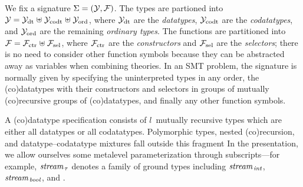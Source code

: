 We fix a signature $\mathrm{\Sigma} = (\mathcal{Y}, \mathcal{F})$. The types are partioned into
$\mathcal{Y} = \mathcal{Y}_{\mathrm{dt}} \mathrel{\uplus} \mathcal{Y}_{\mathrm{codt}} \mathrel{\uplus} \mathcal{Y}_{\mathrm{ord}}$, where $\mathcal{Y}_{\mathrm{dt}}$ are the
\emph{datatypes}, $\mathcal{Y}_{\mathrm{codt}}$ are the \emph{codatatypes}, and $\mathcal{Y}_{\mathrm{ord}}$ are the remaining
\emph{ordinary types}. The functions are partitioned into $\mathcal{F} = \mathcal{F}_{\mathrm{ctr}}
\mathrel{\uplus} \mathcal{F}_{\mathrm{sel}}$, where $\mathcal{F}_{\mathrm{ctr}}$ are the \emph{constructors} and $\mathcal{F}_{\mathrm{sel}}$ are the
\emph{selectors}; there is no need to consider other function symbols because they can
be abstracted away as variables when combining theories.
%
In an SMT problem, the signature is normally given by specifying the
uninterpreted types in any order, the (co)datatypes with their constructors
and selectors in groups of mutually (co)recursive groups of (co)datatypes, and
finally any other function symbols.

A (co)datatype specification consists of $l$~mutually recursive types which are
either all datatypes or all codatatypes. Polymorphic types, nested
(co)recursion, and datatype--codatatype mixtures fall outside this fragment%
In the presentation, we allow ourselves some metalevel parameterization
through subscripts---for example, $\textit{stream}_{\,\tau}$ denotes a
family of ground types including
$\textit{stream}_{\,\textit{int}}$, $\textit{stream}_{\,\textit{bool}}$,
and .

